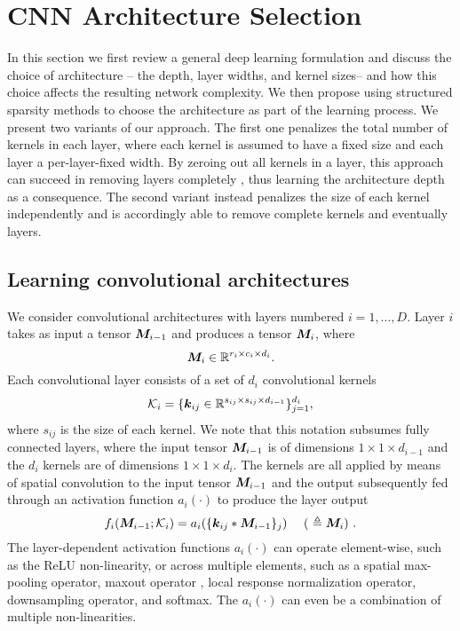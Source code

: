 \section{CNN Architecture Selection}
In this section we first review a general deep learning formulation and discuss the choice of architecture -- the depth, layer widths, and kernel sizes-- and how this choice affects the resulting network complexity. We then propose using structured sparsity methods to choose the architecture as part of the learning process. We present two variants of our approach. The first one penalizes the total number of kernels in each layer, where each kernel is assumed to have a fixed size and each layer a per-layer-fixed width. By zeroing out all kernels in a layer, this approach can succeed in removing layers completely , thus learning the architecture depth as a consequence. The second variant instead penalizes the size of each kernel independently and is accordingly able to remove complete kernels and eventually layers.

\subsection{Learning convolutional architectures}
We consider convolutional architectures with layers numbered $i=1,\ldots,D$. Layer $i$ takes as input a tensor $\bm{M}_{i-1}$ and produces a tensor $\bm{M}_i$, where
\begin{equation}
\bm{M}_{i} \in \mathbb R ^ {r_i \times c_i \times d_i}.
\end{equation}
Each convolutional layer consists of a set of $d_i$ convolutional kernels 
\begin{equation}
  \mathcal{K}_i = \{\bm{k}_{ij} \in \mathbb R^{s_{ij} \times s_{ij} \times d_{i-1}}\}_{j=1}^{d_i},
\end{equation}
where $s_{ij}$ is the size of each kernel. We note that this notation subsumes fully connected layers, where the input tensor $\bm{M}_{i-1}$ is of dimensions $1 \times 1 \times d_{i-1}$ and the $d_i$ kernels are of dimensions $1 \times 1 \times d_i$. The kernels are all applied by means of spatial convolution to the input tensor $\bm{M}_{i-1}$ and the output subsequently fed through an activation function $a_i(\cdot)$  to produce the layer output
\begin{equation}
  f_i(\bm{M}_{i-1}; \mathcal{K}_i) = a_i (\{\bm{k}_{ij} * \bm{M}_{i-1}\}_j) \quad \textrm{  ( $\triangleq \bm{M}_i$) }.
\end{equation}
The layer-dependent activation functions $a_i(\cdot)$ can operate element-wise, such as the ReLU  non-linearity, or across multiple elements, such as a spatial max-pooling operator, maxout operator \cite{Goodfellow2013}, local response normalization operator, downsampling operator, and softmax. The $a_i(\cdot)$  can even be a combination of multiple non-linearities.

